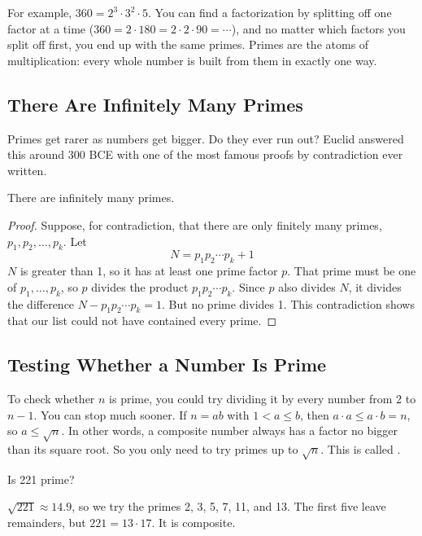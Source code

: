 For example, $360 = 2^3 \cdot 3^2 \cdot 5$. You can find a factorization by
splitting off one factor at a time ($360 = 2 \cdot 180 = 2 \cdot 2 \cdot 90 =
\cdots$), and no matter which factors you split off first, you end up with the
same primes. Primes are the atoms of multiplication: every whole number is
built from them in exactly one way.

\subsection{There Are Infinitely Many Primes}
Primes get rarer as numbers get bigger. Do they ever run out? Euclid answered
this around 300 BCE with one of the most famous proofs by contradiction ever
written.

\begin{theorem}
There are infinitely many primes.
\end{theorem}
\begin{proof}
Suppose, for contradiction, that there are only finitely many primes,
$p_1, p_2, \dots, p_k$. Let
$$N = p_1 p_2 \cdots p_k + 1$$
$N$ is greater than 1, so it has at least one prime factor $p$. That prime
must be one of $p_1, \dots, p_k$, so $p$ divides the product
$p_1 p_2 \cdots p_k$. Since $p$ also divides $N$, it divides the difference
$N - p_1 p_2 \cdots p_k = 1$. But no prime divides 1. This contradiction
shows that our list could not have contained every prime.
\end{proof}

\subsection{Testing Whether a Number Is Prime}
To check whether $n$ is prime, you could try dividing it by every number from
2 to $n - 1$. You can stop much sooner. If $n = ab$ with $1 < a \leq b$, then
$a \cdot a \leq a \cdot b = n$, so $a \leq \sqrt{n}$. In other words, a
composite number always has a factor no bigger than its square root. So you only
need to try primes up to $\sqrt{n}$. This is called .

\begin{Worked}
\begin{Problem}
Is 221 prime?
\end{Problem}
\begin{Solution}
$\sqrt{221} \approx 14.9$, so we try the primes 2, 3, 5, 7,
11, and 13. The first five leave remainders, but $221 = 13 \cdot 17$. It is
composite.
\end{Solution}
\end{Worked}


